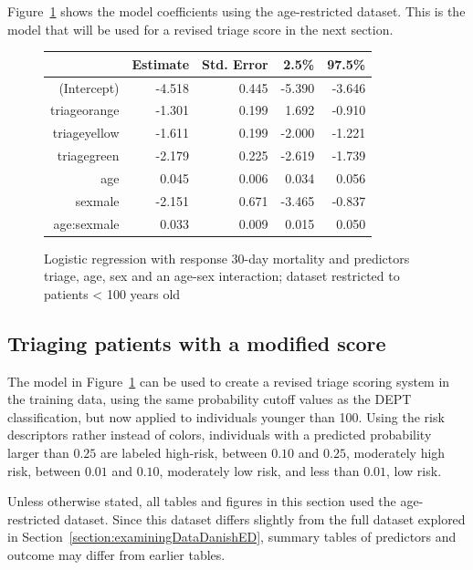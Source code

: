 Figure~\ref{figure:triageAgeSexMort30AgeRestrLogreg} shows the model coefficients using the age-restricted dataset.  This is the model that will be used for a revised triage score in the next section.

\begin{figure}[htp]
\centering
\begin{tabular}{rrrrr}
  \hline
  & Estimate & Std. Error & 2.5\% & 97.5\%  \\ 
  \hline
  (Intercept) & -4.518 & 0.445 & -5.390 & -3.646 \\ 
  triageorange & -1.301 & 0.199 & 1.692 & -0.910  \\ 
  triageyellow & -1.611 & 0.199 & -2.000 & -1.221  \\ 
  triagegreen & -2.179 & 0.225 & -2.619 & -1.739  \\ 
  age & 0.045 & 0.006 & 0.034  & 0.056 \\ 
  sexmale & -2.151 & 0.671 & -3.465 & -0.837 \\ 
  age:sexmale & 0.033 & 0.009 &  0.015 & 0.050  \\ 
   \hline
\end{tabular}
\caption{Logistic regression with response 30-day mortality and 
       predictors triage, age, sex and an age-sex interaction; dataset restricted to patients < 100 years old} 
\label{figure:triageAgeSexMort30AgeRestrLogreg}
\end{figure}

\subsection{Triaging patients with a modified score}
\label{section:triageWithModifiedScore}

The model in Figure~\ref{figure:triageAgeSexMort30AgeRestrLogreg} can be used to create a revised triage scoring system in the training data, using the same probability cutoff values as the DEPT classification, but now applied to individuals younger than 100. Using the risk descriptors rather instead of colors, individuals with a predicted probability larger than $0.25$ are labeled high-risk, between $0.10$ and $0.25$, moderately high risk, between $0.01$ and $0.10$, moderately low risk, and less than $0.01$, low risk.  

Unless otherwise stated, all tables and figures in this section used the age-restricted dataset. Since this dataset differs slightly from the full dataset explored in Section~\ref{section:examiningDataDanishED}, summary tables of predictors and outcome may differ from earlier tables. 


